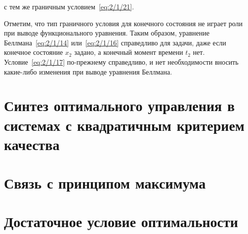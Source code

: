 с тем же граничным условием~\ref{eq:2/1/21}.

Отметим, что тип граничного условия для конечного состояния не играет роли при выводе функционального уравнения. Таким образом, уравнение Беллмана~\ref{eq:2/1/14} или~\vref{eq:2/1/16} справедливо для задачи, даже если конечное состояние $x_2$ задано, а конечный момент времени $t_2$ нет. Условие~\vref{eq:2/1/17} по-прежнему справедливо, и нет необходимости вносить какие-либо изменения при выводе уравнения Беллмана.



\section{Синтез оптимального управления в системах с квадратичным критерием качества}



\section{Связь с принципом максимума}



\section{Достаточное условие оптимальности}

